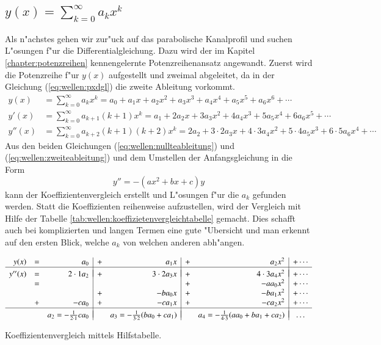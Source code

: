 \subsection{\texorpdfstring{$y(x) = \sum_{k = 0}^{\infty} a_{k}x^k$}{y(x) = 
summe k = 0 bis unendlich ak xk}}
\label{subsec:wellen:Potenzreihenansatz}

Als n"achstes gehen wir zur"uck auf das parabolische Kanalprofil und suchen 
L"osungen f"ur die Differentialgleichung. Dazu wird der im Kapitel 
\ref{chapter:potenzreihen} kennengelernte Potenzreihenansatz angewandt.
Zuerst wird die Potenzreihe f"ur $y(x)$ aufgestellt und zweimal abgeleitet, da 
in der Gleichung (\ref{eq:wellen:pxdgl}) die zweite Ableitung vorkommt.
\begin{align}
	y(x)
	&=
	\sum_{k = 0}^{\infty} a_{k}x^k
	=
	a_0 + a_1x + a_2x^2 + a_3x^3 + a_4x^4 + a_5x^5 + a_6x^6 + \dotsb
	\label{eq:wellen:nullteableitung}
	\\
	y'(x)
	&=
	\sum_{k=0}^{\infty} a_{k+1}(k+1)x^k
	=
	a_1 + 2a_2x + 3a_3x^2 + 4a_4x^3 + 5a_5x^4 + 6a_6x^5+ \dotsb
	\\
	y''(x)
	&=
	\sum_{k = 0}^{\infty} a_{k+2}(k+1)(k+2)x^k
	=
	2a_2 + 3 \mathbin{\cdot} 2a_3x + 4 \mathbin{\cdot} 3a_4x^2 + 5 
	\mathbin{\cdot} 4a_5x^3 + 6 \mathbin{\cdot} 5a_6x^4 + \dotsb
	\label{eq:wellen:zweiteableitung}
\end{align}
Aus den beiden Gleichungen (\ref{eq:wellen:nullteableitung}) und
(\ref{eq:wellen:zweiteableitung}) und dem Umstellen der Anfangsgleichung in die 
Form
\begin{equation*}
	y'' = -(ax^2+bx+c)y
\end{equation*}
kann der Koeffizientenvergleich erstellt und L"osungen f"ur die $a_k$ gefunden 
werden. Statt die Koeffizienten reihenweise aufzustellen, wird der Vergleich 
mit Hilfe der Tabelle \ref{tab:wellen:koeffizietenvergleichtabelle} gemacht. 
Dies schafft auch bei komplizierten und langen Termen eine gute "Ubersicht und 
man erkennt auf den ersten Blick, welche $a_k$ von welchen anderen abh"angen.
\begin{table}
	\centering
	\begin{equation*}
		\begin{array}{r c r | c r | c r | c r c}
		y(x) & = &
		a_0 & + & a_1x & + & a_2x^2 & + \dotsb
		\\
		\hline&&&&&&&\\[-2ex]
		y''(x) & = &
		2\cdot1 a_2 & + & 3\cdot2 a_3x & + & 4\cdot3 a_4x^2 & + \dotsb
		\\
		& = &
		& & & + &- aa_0x^2 & + \dotsb
		\\
		& &
		& + &- ba_0x & + &- ba_1x^2 & + \dotsb
		\\
		& + &
		-ca_0 & + &- ca_1x & + &- ca_2x^2 & + \dotsb
		\\
		\hline&&&&&&&\\[-2ex]
		& &
		a_2 = -\frac{1}{2 \cdot 1}ca_0
		& & a_3 = -\frac{1}{3 \cdot 2}(ba_0+ca_1)
		& & a_4 = -\frac{1}{4 \cdot 3}(aa_0+ba_1+ca_2)
		& \dots
		\end{array}
	\end{equation*}
	\caption{Koeffizientenvergleich mittels Hilfstabelle.}
	\label{tab:wellen:koeffizietenvergleichtabelle}
\end{table}

